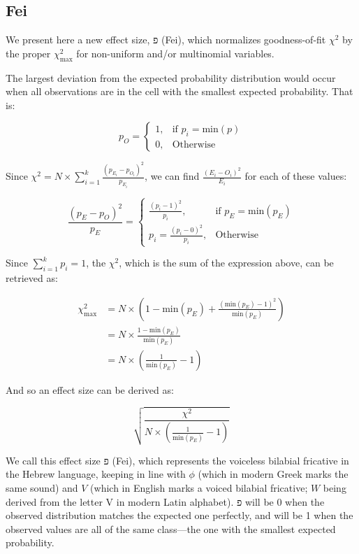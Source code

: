 \documentclass[
]{article}
\begin{document}
\hypertarget{fei}{%
\subsection{Fei}\label{fei}}

We present here a new effect size, פ (Fei), which normalizes
goodness-of-fit \(\chi^2\) by the proper \(\chi^2_\text{max}\) for
non-uniform and/or multinomial variables.

The largest deviation from the expected probability distribution would
occur when all observations are in the cell with the smallest expected
probability. That is:

\[
p_{O} = 
\begin{cases}
1, & \text{if } p_i = \text{min}(p) \\
0, & \text{Otherwise}
\end{cases}
\]

Since
\(\chi^2 = N \times\sum_{i=1}^{k}{\frac{(p_{E_i}-p_{O_i})^2}{p_{E_i}}}\),
we can find \(\frac{(E_i-O_i)^2}{E_i}\) for each of these values:

\[
\frac{(p_{E}-p_{O})^2}{p_{E}} = 
\begin{cases}
\frac{(p_i-1)^2}{p_i}, & \text{if } p_{E} = \text{min}(p_{E}) \\
p_i = \frac{(p_i-0)^2}{p_i}, & \text{Otherwise}
\end{cases}
\]

Since \(\sum_{i=1}^{k}{p_i}=1\), the \(\chi^2\), which is the sum of the
expression above, can be retrieved as:

\[
\begin{split}
\chi^2_\text{max} & = N \times (1 - \text{min}(p_E) + \frac{(\text{min}(p_E)-1)^2}{\text{min}(p_E)}) \\
 & = N \times \frac{1-\text{min}(p_E)}{\text{min}(p_E)} \\
 & = N \times (\frac{1}{\text{min}(p_E)} - 1)
\end{split}
\]

And so an effect size can be derived as:

\[
\sqrt{\frac{\chi^2}{N \times (\frac{1}{\text{min}(p_E)} - 1)}}
\]

We call this effect size פ (Fei), which represents the voiceless
bilabial fricative in the Hebrew language, keeping in line with \(\phi\)
(which in modern Greek marks the same sound) and \(V\) (which in English
marks a voiced bilabial fricative; \(W\) being derived from the letter V
in modern Latin alphabet). פ will be 0 when the observed distribution
matches the expected one perfectly, and will be 1 when the observed
values are all of the same class---the one with the smallest expected
probability.
\end{document}
